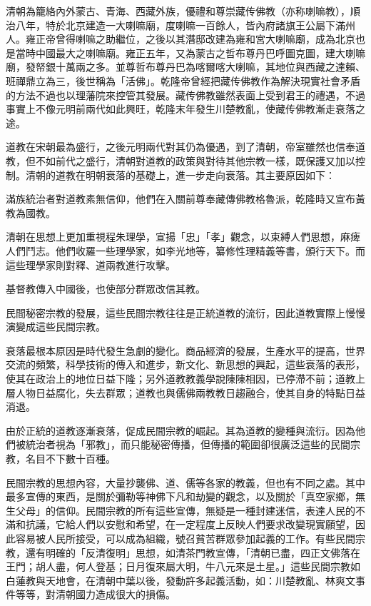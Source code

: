 清朝為籠絡內外蒙古、青海、西藏外族，優禮和尊崇藏传佛教（亦称喇嘛教），順治八年，特於北京建造一大喇嘛廟，度喇嘛一百餘人，皆內府諸旗王公屬下滿州人。雍正帝曾得喇嘛之助繼位，之後以其潛邸改建為雍和宮大喇嘛廟，成為北京也是當時中國最大之喇嘛廟。雍正五年，又為蒙古之哲布尊丹巴呼圖克圖，建大喇嘛廟，發帑銀十萬兩之多。並尊哲布尊丹巴為喀爾喀大喇嘛，其地位與西藏之達賴、班禪鼎立為三，後世稱為「活佛」。乾隆帝曾經把藏传佛教作為解決現實社會矛盾的方法不過也以理藩院來控管其發展。藏传佛教雖然表面上受到君王的禮遇，不過事實上不像元明前兩代如此興旺，乾隆末年發生川楚教亂，使藏传佛教漸走衰落之途。

道教在宋朝最為盛行，之後元明兩代對其仍為優遇，到了清朝，帝室雖然也信奉道教，但不如前代之盛行，清朝對道教的政策與對待其他宗教一樣，既保護又加以控制。清朝的道教在明朝衰落的基礎上，進一步走向衰落。其主要原因如下：

滿族統治者對道教素無信仰，他們在入關前尊奉藏傳佛教格魯派，乾隆時又宣布黃教為國教。

清朝在思想上更加重視程朱理學，宣揚「忠」「孝」觀念，以束縛人們思想，麻痺人們鬥志。他們收羅一些理學家，如李光地等，纂修性理精義等書，頒行天下。而這些理學家則對釋、道兩教進行攻擊。

基督教傳入中國後，也使部分群眾改信其教。

民間秘密宗教的發展，這些民間宗教往往是正統道教的流衍，因此道教實際上慢慢演變成這些民間宗教。

衰落最根本原因是時代發生急劇的變化。商品經濟的發展，生產水平的提高，世界交流的頻繁，科學技術的傳入和進步，新文化、新思想的興起，這些衰落的表形，使其在政治上的地位日益下隆；另外道教教義學說陳陳相因，已停滯不前；道教上層人物日益腐化，失去群眾；道教也與儒佛兩教教日趨融合，使其自身的特點日益消退。

由於正統的道教逐漸衰落，促成民間宗教的崛起。其為道教的變種與流衍。因為他們被統治者視為「邪教」，而只能秘密傳播，但傳播的範圍卻很廣泛這些的民間宗教，名目不下數十百種。

民間宗教的思想內容，大量抄襲佛、道、儒等各家的教義，但也有不同之處。其中最多宣傳的東西，是關於彌勒等神佛下凡和劫變的觀念，以及關於「真空家鄉，無生父母」的信仰。民間宗教的所有這些宣傳，無疑是一種封建迷信，表達人民的不滿和抗議，它給人們以安慰和希望，在一定程度上反映人們要求改變現實願望，因此容易被人民所接受，可以成為組織，號召貧苦群眾參加起義的工作。有些民間宗教，還有明確的「反清復明」思想，如清茶門教宣傳，「清朝已盡，四正文佛落在王門；胡人盡，何人登基；日月復來屬大明，牛八元來是土星。」這些民間宗教如白蓮教與天地會，在清朝中葉以後，發動許多起義活動，如：川楚教亂、林爽文事件等等，對清朝國力造成很大的損傷。

